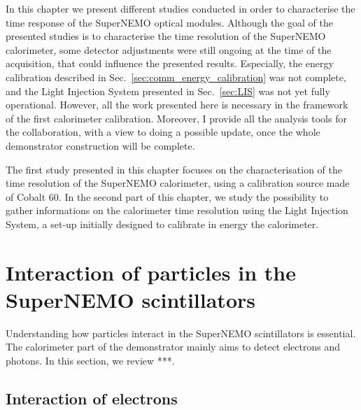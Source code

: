 In this chapter we present different studies conducted in order to characterise the time response of the SuperNEMO optical modules.
Although the goal of the presented studies is to characterise the time resolution of the SuperNEMO calorimeter, some detector adjustments were still ongoing at the time of the acquisition, that could influence the presented results.
Especially, the energy calibration described in Sec.~\ref{sec:comm_energy_calibration} was not complete, and the Light Injection System presented in Sec.~\ref{sec:LIS} was not yet fully operational.
However, all the work presented here is necessary in the framework of the first calorimeter calibration.
Moreover, I provide all the analysis tools for the collaboration, with a view to doing a possible update, once the whole demonstrator construction will be complete.

The first study presented in this chapter focuses on the characterisation of the time resolution of the SuperNEMO calorimeter, using a calibration source made of Cobalt $60$.
In the second part of this chapter, we study the possibility to gather informations on the calorimeter time resolution using the Light Injection System, a set-up initially designed to calibrate in energy the calorimeter.

\section{Interaction of particles in the SuperNEMO scintillators}
\label{sec:scintillator_interactions}

Understanding how particles interact in the SuperNEMO scintillators is essential.
The calorimeter part of the demonstrator mainly aims to detect electrons and photons.
In this section, we review ***.


\subsection{Interaction of electrons}

